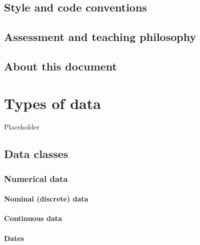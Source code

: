 \documentclass[english,10pt,a4paper,oneside]{book}
\begin{document}
\hypertarget{style-and-code-conventions}{%
\section{Style and code conventions}\label{style-and-code-conventions}}

\hypertarget{assessment-and-teaching-philosophy}{%
\section{Assessment and teaching philosophy}\label{assessment-and-teaching-philosophy}}

\hypertarget{about-this-document}{%
\section{About this document}\label{about-this-document}}

\hypertarget{types-of-data}{%
\chapter{Types of data}\label{types-of-data}}

Placeholder

\hypertarget{data-classes}{%
\section{Data classes}\label{data-classes}}

\hypertarget{numerical-data}{%
\subsection{Numerical data}\label{numerical-data}}

\hypertarget{nominal-discrete-data}{%
\subsubsection{Nominal (discrete) data}\label{nominal-discrete-data}}

\hypertarget{continuous-data}{%
\subsubsection{Continuous data}\label{continuous-data}}

\hypertarget{dates}{%
\subsubsection{Dates}\label{dates}}
\end{document}

